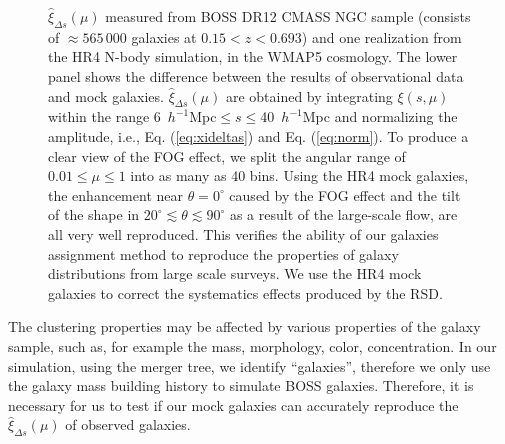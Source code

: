 \documentclass[iop]{emulateapj}
\begin{document}
\begin{figure}
   \caption{\label{fig_datamock}
   $\hat\xi_{\Delta s}(\mu)$ measured from BOSS DR12 CMASS NGC sample 
    (consists of $\approx 565\,000$ galaxies at $0.15 < z < 0.693$)
    and one realization from the HR4 N-body simulation, in the WMAP5 cosmology.
   The lower panel shows the difference between the results of observational data and mock galaxies.
   $\hat\xi_{\Delta s}(\mu)$ are obtained by integrating $\xi (s,\mu)$ within the range {\rm 6\ $h^{-1}$Mpc}$\leq s\leq${\rm 40\ $h^{-1}$Mpc} 
      and normalizing the amplitude, 
    i.e., Eq. (\ref{eq:xideltas}) and Eq. (\ref{eq:norm}).
   To produce a clear view of the FOG effect, we split the angular range of $0.01\leq \mu \leq 1$ into as many as 40 bins.
   Using the HR4 mock galaxies, the enhancement near $\theta=0^\circ$ caused by the FOG effect
    and the tilt of the shape in $20^\circ\lesssim\theta\lesssim90^\circ$ 
    as a result of the large-scale flow,
    are all very well reproduced.
   This verifies the ability of our galaxies assignment method \citep{hong2016} 
    to reproduce the properties of galaxy distributions from large scale surveys.
   We use the HR4 mock galaxies to correct the systematics effects produced by the RSD.
   }
\end{figure}


The clustering properties may be affected by various properties of the galaxy sample, 
such as, for example the mass, morphology, color, concentration. 
In our simulation, using the merger tree, 
we identify ``galaxies'', therefore we only use the galaxy mass building history to simulate BOSS galaxies. 
Therefore, it is necessary for us to test if our mock galaxies can accurately 
reproduce the $\hat\xi_{\Delta s}(\mu)$ of observed galaxies.
\end{document}
